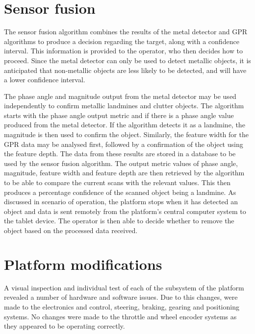 \documentclass[main.tex]{subfiles}
\begin{document}
\section{Sensor fusion}
The sensor fusion algorithm combines the results of the metal detector and GPR algorithms to produce a decision regarding the target, along with a confidence interval. This information is provided to the operator, who then decides how to proceed. Since the metal detector can only be used to detect metallic objects, it is anticipated that non-metallic objects are less likely to be detected, and will have a lower confidence interval. 


The phase angle and magnitude output from the metal detector may be used independently to confirm metallic landmines and clutter objects. The algorithm starts with the phase angle output metric and if there is a phase angle value produced from the metal detector. If the algorithm detects it as a landmine, the magnitude is then used to confirm the object. Similarly, the feature width for the GPR data may be analysed first, followed by a confirmation of the object using the feature depth. The data from these results are stored in a database to be used by the sensor fusion algorithm. The output metric values of phase angle, magnitude, feature width and feature depth are then retrieved by the algorithm to be able to compare the current scans with the relevant values. This then produces a percentage confidence of the scanned object being a landmine. As discussed in scenario of operation, the platform stops when it has detected an object and data is sent remotely from the platform’s central computer system to the tablet device. The operator is then able to decide whether to remove the object based on the processed data received.

\section{Platform modifications}
A visual inspection and individual test of each of the subsystem of the platform revealed a number of hardware and software issues. Due to this changes, were made to the electronics and control, steering, braking, gearing and positioning systems. No changes were made to the throttle and wheel encoder systems as they appeared to be operating correctly. 
\end{document}
